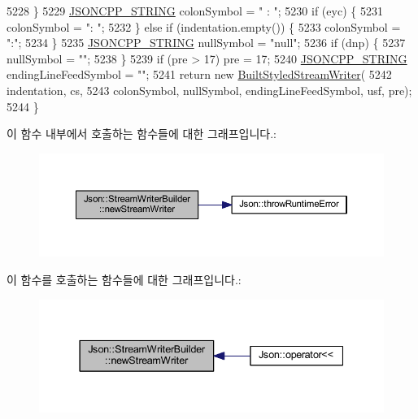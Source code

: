 \begin{DoxyCode}
5228   \}
5229   \hyperlink{json-forwards_8h_a1e723f95759de062585bc4a8fd3fa4be}{JSONCPP\_STRING} colonSymbol = \textcolor{stringliteral}{" : "};
5230   \textcolor{keywordflow}{if} (eyc) \{
5231     colonSymbol = \textcolor{stringliteral}{": "};
5232   \} \textcolor{keywordflow}{else} \textcolor{keywordflow}{if} (indentation.empty()) \{
5233     colonSymbol = \textcolor{stringliteral}{":"};
5234   \}
5235   \hyperlink{json-forwards_8h_a1e723f95759de062585bc4a8fd3fa4be}{JSONCPP\_STRING} nullSymbol = \textcolor{stringliteral}{"null"};
5236   \textcolor{keywordflow}{if} (dnp) \{
5237     nullSymbol = \textcolor{stringliteral}{""};
5238   \}
5239   \textcolor{keywordflow}{if} (pre > 17) pre = 17;
5240   \hyperlink{json-forwards_8h_a1e723f95759de062585bc4a8fd3fa4be}{JSONCPP\_STRING} endingLineFeedSymbol = \textcolor{stringliteral}{""};
5241   \textcolor{keywordflow}{return} \textcolor{keyword}{new} \hyperlink{struct_json_1_1_built_styled_stream_writer}{BuiltStyledStreamWriter}(
5242       indentation, cs,
5243       colonSymbol, nullSymbol, endingLineFeedSymbol, usf, pre);
5244 \}
\end{DoxyCode}
이 함수 내부에서 호출하는 함수들에 대한 그래프입니다.\+:\nopagebreak
\begin{figure}[H]
\begin{center}
\leavevmode
\includegraphics[width=350pt]{class_json_1_1_stream_writer_builder_ab9ee278609f88ae04a7c1a84e1f559e6_cgraph}
\end{center}
\end{figure}
이 함수를 호출하는 함수들에 대한 그래프입니다.\+:\nopagebreak
\begin{figure}[H]
\begin{center}
\leavevmode
\includegraphics[width=337pt]{class_json_1_1_stream_writer_builder_ab9ee278609f88ae04a7c1a84e1f559e6_icgraph}
\end{center}
\end{figure}
\mbox{\label{class_json_1_1_stream_writer_builder_af68f6b59cb20b074052ed12bb3d336a3}} 
